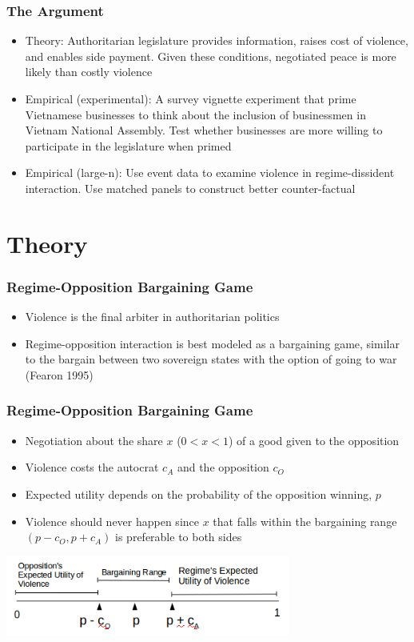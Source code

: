 \documentclass{beamer}
\begin{document}
\begin{frame}
\frametitle{The Argument}
\begin{itemize}
\item<1-> Theory: Authoritarian legislature provides information, raises cost of violence, and enables side payment. Given these conditions, negotiated peace is more likely than costly violence
\item<2-> Empirical (experimental): A survey vignette experiment that prime Vietnamese businesses to think about the inclusion of businessmen in Vietnam National Assembly. Test whether businesses are more willing to participate in the legislature when primed
\item<3-> Empirical (large-n): Use event data to examine violence in regime-dissident interaction. Use matched panels to construct better counter-factual
\end{itemize}
\end{frame}


\section{Theory}
\begin{frame}
\frametitle{Regime-Opposition Bargaining Game}
\begin{itemize}
\item Violence is the final arbiter in authoritarian politics
\item Regime-opposition interaction is best modeled as a bargaining game, similar to the bargain between two sovereign states with the option of going to war (Fearon 1995)
\end{itemize}
\end{frame}

\begin{frame}
\frametitle{Regime-Opposition Bargaining Game}
\centering
\begin{itemize}
\item Negotiation about the share $x$ ($0 < x < 1$) of a good given to the opposition
\item Violence costs the autocrat $c_A$ and the opposition $c_O$
\item Expected utility depends on the probability of the opposition winning, $p$
\item<2-> Violence should never happen since $x$ that falls within the bargaining range $(p - c_O, p + c_A)$ is preferable to both sides
\end{itemize}
\includegraphics[width=0.7\textwidth]{general_model}
\end{frame}
\end{document}
